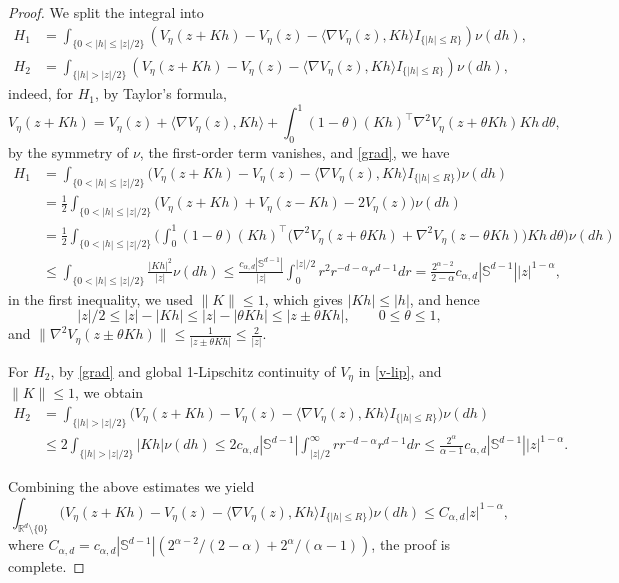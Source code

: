 \documentclass[11pt,reqno]{amsart}
\numberwithin{equation}{section}
\newcommand{\s}{\mathbb{S}}
\begin{document}
\begin{proof}
We split the integral into
	\begin{align*}
		H_1&=\int_{\{0<|h|\leq |z|/2\}}\left( V_\eta(z+Kh)-V_\eta(z)
		-\langle\nabla V_\eta(z),Kh\rangle I_{\{|h|\leq R\}}\right) \nu(dh),\\
		H_2&=\int_{\{|h|>|z|/2\}}\left( V_\eta(z+Kh)-V_\eta(z)
		-\langle\nabla V_\eta(z),Kh\rangle	I_{\{|h|\leq R\}}\right) \nu(dh),
	\end{align*}
	indeed, for $H_1$, by Taylor's formula, 
	$$V_\eta(z+Kh)=V_\eta(z)+\langle \nabla V_\eta(z), Kh\rangle
	+\int_0^1 (1-\theta)
	(Kh)^\top \nabla^2 V_\eta(z+\theta Kh) Kh\, d\theta,$$
	by the symmetry of $\nu$, the first-order term vanishes, and  \eqref{grad},  we have
	\begin{align*}
		H_1&=\int_{\{0<|h|\leq |z|/2\}}
		\Big(V_\eta(z+Kh)-V_\eta(z)
		-\langle\nabla V_\eta(z),Kh\rangle	I_{\{|h|\leq R\}}	\Big)\nu(dh)	\\
		&=	\frac12	\int_{\{0<|h|\leq |z|/2\}}
		\Big(V_\eta(z+Kh)+V_\eta(z-Kh)-2V_\eta(z)\Big)\nu(dh)
		\\
		&=   \frac12	\int_{\{0<|h|\leq |z|/2\}}	\Big(	\int_0^1(1-\theta)	(Kh)^{\top}
		\Big(\nabla^2V_\eta(z+\theta Kh)	+\nabla^2V_\eta(z-\theta Kh)\Big)Kh\,d\theta	\Big)\nu(dh)\\
		&\leq	\int_{\{0<|h|\leq |z|/2\}}\frac{|Kh|^2}{|z|}\nu(dh)\leq \frac{c_{\alpha,d}|\s^{d-1} |}{|z|}\int_0^{|z|/2}r^2 r^{-d-\alpha}r^{d-1}dr=	\frac{2^{\alpha-2}}{2-\alpha} c_{\alpha,d}|\s^{d-1}| |z|^{1-\alpha},
	\end{align*}
 in the first inequality, we used $\|K\|\leq1$, which gives
	$|Kh|\leq |h|$, and hence
	$$
	|z|/2  \leq |z|-|Kh|\leq   |z|-|\theta Kh| \leq|z\pm\theta Kh|,
	\qquad 0\leq\theta\leq1,
	$$
	and 
	$\|\nabla^2V_\eta(z\pm\theta Kh)\|\leq\frac{1}{|z\pm\theta Kh|}\leq\frac{2}{|z|}.$
	
	For $H_2$, by \eqref{grad} and global 1-Lipschitz continuity of $V_\eta$ in \eqref{v-lip}, and $\|K\|\leq1$, we obtain
	\begin{align*}
		H_2&=\int_{\{|h|>|z|/2\}}
		\Big(
		V_\eta(z+Kh)-V_\eta(z)
		-\langle\nabla V_\eta(z),Kh\rangle I_{\{|h|\leq R\}}
		\Big)\nu(dh)\\
		&\leq	2\int_{\{|h|>|z|/2\}}|Kh|\nu(dh)
		\leq	2c_{\alpha,d}|\s^{d-1} |\int_{|z|/2}^{\infty}r r^{-d-\alpha}r^{d-1}dr\leqslant	\frac{2^{\alpha}}{\alpha-1}c_{\alpha,d}|\s^{d-1}| |z|^{1-\alpha}.
	\end{align*}
	
	Combining the above estimates we yield
	\begin{equation*}
		\int_{\mathbb R^{d}\setminus\{0\}}
		\Big(	V_\eta(z+Kh)-V_\eta(z)
		-\langle\nabla V_\eta(z),Kh\rangle
		I_{\{|h|\leq R\}}\Big)\nu(dh)\leq C_{\alpha,d}|z|^{1-\alpha},
	\end{equation*}
	where $C_{\alpha,d}=
	c_{\alpha,d}|\mathbb S^{d-1}|
	\left(	2^{\alpha-2}/(2-\alpha)+2^{\alpha}/(\alpha-1)
	\right)$, 
	the proof is complete.
\end{proof}
\end{document}
